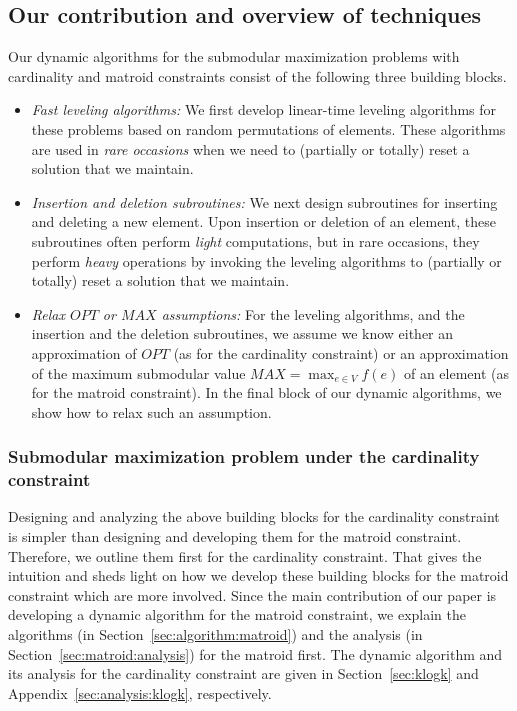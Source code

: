 \documentclass[11pt]{article}
\begin{document}
\subsection{Our contribution and overview of techniques}
\label{sec:contrib}
Our dynamic algorithms for the submodular maximization problems with cardinality and matroid constraints 
consist of the following three building blocks. 
\begin{itemize}
    \item \emph{Fast leveling algorithms:} We first develop linear-time leveling algorithms 
    for these problems based on random permutations of elements.  
    These algorithms are used in \emph{rare occasions} when we need to (partially or totally) reset a solution that we maintain.  
    \item \emph{Insertion and deletion subroutines:} We next design subroutines for inserting and deleting a new element. 
    Upon insertion or deletion of an element, these subroutines often perform \emph{light} computations, but in rare occasions, 
    they perform \emph{heavy} operations by invoking the leveling algorithms to (partially or totally) reset a solution that we maintain. 
    \item \emph{Relax $OPT$ or $MAX$ assumptions:} For the leveling algorithms, and the insertion and the deletion subroutines, 
    we assume we know either an approximation of $OPT$ (as for the cardinality constraint) or 
    an approximation of the maximum submodular value $MAX = \max_{e \in V} f(e)$ of an element (as for the matroid constraint). 
    In the final block of our dynamic algorithms, we show how to relax such an assumption. 
\end{itemize}



\subsubsection{Submodular maximization problem  under the cardinality constraint} 
Designing and analyzing the above building blocks for the cardinality constraint is simpler than 
designing and developing them for the matroid constraint. 
Therefore, we outline them first for the cardinality constraint. 
That gives the intuition and sheds light on how we develop these building blocks for the matroid constraint 
which are more involved. 
Since the main contribution of our paper is developing a dynamic algorithm for the matroid constraint, 
we explain the algorithms (in Section~\ref{sec:algorithm:matroid}) and the analysis (in Section~\ref{sec:matroid:analysis}) for the matroid first. 
The dynamic algorithm and its analysis for the cardinality constraint are given in Section~\ref{sec:klogk} and Appendix~\ref{sec:analysis:klogk}, respectively. 
\end{document}
